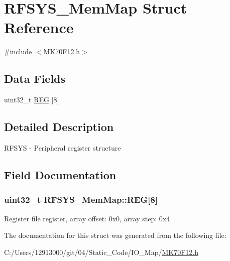 \hypertarget{struct_r_f_s_y_s___mem_map}{}\section{R\+F\+S\+Y\+S\+\_\+\+Mem\+Map Struct Reference}
\label{struct_r_f_s_y_s___mem_map}


{\ttfamily \#include $<$M\+K70\+F12.\+h$>$}

\subsection*{Data Fields}
\begin{DoxyCompactItemize}
\item 
uint32\+\_\+t \hyperlink{struct_r_f_s_y_s___mem_map_a9ecc7686e575e2e1570cf50aa3234276}{R\+E\+G} \mbox{[}8\mbox{]}
\end{DoxyCompactItemize}


\subsection{Detailed Description}
R\+F\+S\+Y\+S -\/ Peripheral register structure 

\subsection{Field Documentation}
\hypertarget{struct_r_f_s_y_s___mem_map_a9ecc7686e575e2e1570cf50aa3234276}{}
\subsubsection[{R\+E\+G}]{\setlength{\rightskip}{0pt plus 5cm}uint32\+\_\+t R\+F\+S\+Y\+S\+\_\+\+Mem\+Map\+::\+R\+E\+G\mbox{[}8\mbox{]}}\label{struct_r_f_s_y_s___mem_map_a9ecc7686e575e2e1570cf50aa3234276}
Register file register, array offset\+: 0x0, array step\+: 0x4 

The documentation for this struct was generated from the following file\+:\begin{DoxyCompactItemize}
\item 
C\+:/\+Users/12913000/git/04/\+Static\+\_\+\+Code/\+I\+O\+\_\+\+Map/\hyperlink{_m_k70_f12_8h}{M\+K70\+F12.\+h}\end{DoxyCompactItemize}
